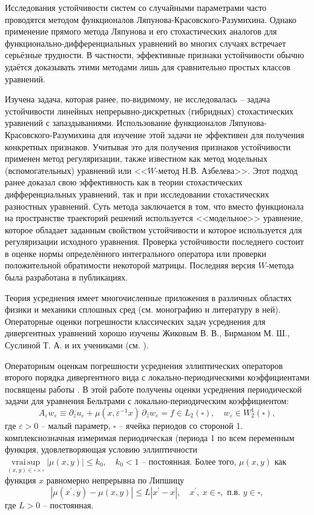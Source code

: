 Исследования устойчивости систем со случайными параметрами часто
проводятся методом функционалов Ляпунова-Красовского-Разумихина.
Однако применение прямого метода Ляпунова и его стохастических
аналогов для функцио\-нально-диф\-фе\-рен\-ци\-аль\-ных уравнений во
многих случаях встречает серьёзные трудности. В частности,
эффективные признаки устойчивости обычно удаётся доказывать этими
методами лишь для сравнительно простых классов уравнений.

Изучена задача, которая ранее, по-видимому, не исследовалась --
задача устойчивости линейных непрерывно-дискретных (гибридных)
стохастических уравнений с запаздываниями. Использование
функционалов Ляпунова-Красовского-Разумихина для изучение этой
задачи не эффективен  для получения конкретных признаков. Учитывая
это для получения признаков устойчивости применен метод
регуляризации, также известном как метод модельных (вспомогательных)
уравнений или <<$W$-метод Н.В. Азбелева>>. Этот подход ранее доказал
свою эффективность как в теории стохастических дифференциальных
уравнений, так и при исследовании стохастических разностных
уравнений. Суть метода заключается в том, что вместо функционала на
пространстве траекторий решений используется <<модельное>>
уравнение, которое обладает заданным свойством устойчивости и
которое используется для регуляризации исходного уравнения. Проверка
устойчивости последнего состоит в оценке нормы определённого
интегрального оператора или проверки положительной обратимости
некоторой матрицы. Последняя версия $W$-метода была разработана в
публикациях.


Теория усреднения имеет многочисленные приложения в различных областях физики и механики сплошных сред (см. монографию \cite{smm-1} и литературу в  ней). Операторные оценки погрешности классических задач усреднения для дивергентных уравнений хорошо изучены Жиковым В. В., Бирманом   М. Ш., Суслиной  Т. А. и их учениками (см. \cite{smm-2,smm-3}).

Операторным оценкам погрешности усреднения  эллиптических операторов второго порядка дивергентного вида  с локально-периодическими коэффициентами посвящены работы \cite{smm-4,smm-5,smm-6,smm-7}.
В этой работе получены оценки усреднения периодической задачи  для уравнения Бельтрами с локально-периодическим коэффициентом:
$$
	A_\varepsilon w_\varepsilon\equiv\partial_{\bar{z}}u_\varepsilon+\mu(x,\varepsilon^{-1}x)\,\partial_z w_\varepsilon
=f\in L_2(\square),\quad w_\varepsilon\in W_2^1(\square),
$$
где $\varepsilon>0$ -- малый параметр, $\square$ -- ячейка периодов со стороной 1.
комплекснозначная измеримая периодическая (периода 1 по всем переменным   функция, удовлетворяющая условию эллиптичности
 $\mathop{vrai\, sup}\limits_{(x,y)\in\square\times\square}|\mu(x,y)|\leqslant k_0,\quad k_0<1$  -- постоянная.
 Более того, $\mu(x,y)$  как функция $x$ равномерно непрерывна по Липшицу
$$
|\mu(x^\prime,y)-\mu(x,y)|\leqslant L|x^\prime-x|,\quad x^\prime,\ x\in\square,  \text{ \ п.в.\ }   y\in\square,
$$
где $L>0$ -- постоянная.

